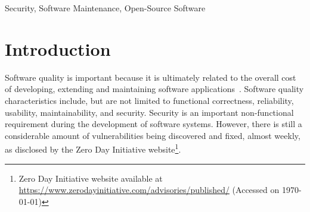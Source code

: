 \documentclass[10pt,conference]{IEEEtran}
\begin{document}
\begin{IEEEkeywords}
Security, Software Maintenance, Open-Source Software
\end{IEEEkeywords}

\section{Introduction}
%
Software quality is important because it is ultimately related to the overall
cost of developing, extending and maintaining software applications~\cite{slaughter1998evaluating}. 
Software quality characteristics include, but are not limited to functional correctness,
reliability, usability, maintainability, and security. Security is an 
important non-functional requirement during the development of software systems. 
However, there is still a considerable amount of vulnerabilities being
discovered and fixed, almost weekly, as disclosed by the Zero Day Initiative
website\footnote{Zero Day Initiative website available at
\url{https://www.zerodayinitiative.com/advisories/published/} (Accessed on \today{})}.
%
\end{document}
